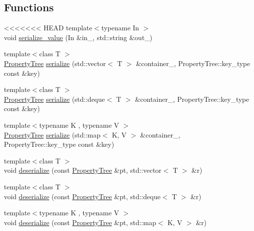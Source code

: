 \subsection*{Functions}
\begin{DoxyCompactItemize}
\item 
<<<<<<< HEAD
{\footnotesize template$<$typename In $>$ }\\void \hyperlink{namespaceserialize_afcd8d07d106f4bf71ce8813e6c2ccbd8}{serialize\+\_\+value} (In \&in\+\_\+, std\+::string \&out\+\_\+)
\item 
{\footnotesize template$<$class T $>$ }\\\hyperlink{namespacesolar__core_adeda2737d6938c190eb774a5b2495045}{Property\+Tree} \hyperlink{namespaceserialize_a48d3582d3d99189f6f067e77d962574f}{serialize} (std\+::vector$<$ T $>$ \&container\+\_\+, Property\+Tree\+::key\+\_\+type const \&key)
\item 
{\footnotesize template$<$class T $>$ }\\\hyperlink{namespacesolar__core_adeda2737d6938c190eb774a5b2495045}{Property\+Tree} \hyperlink{namespaceserialize_aa60e366236e42c68f437ea409aa0e056}{serialize} (std\+::deque$<$ T $>$ \&container\+\_\+, Property\+Tree\+::key\+\_\+type const \&key)
\item 
{\footnotesize template$<$typename K , typename V $>$ }\\\hyperlink{namespacesolar__core_adeda2737d6938c190eb774a5b2495045}{Property\+Tree} \hyperlink{namespaceserialize_a585cc862a49aec3bc1deca353af0b53c}{serialize} (std\+::map$<$ K, V $>$ \&container\+\_\+, Property\+Tree\+::key\+\_\+type const \&key)
\item 
{\footnotesize template$<$class T $>$ }\\void \hyperlink{namespaceserialize_a4c500beb6e6b8eb1c9e62376d3f5ce83}{deserialize} (const \hyperlink{namespacesolar__core_adeda2737d6938c190eb774a5b2495045}{Property\+Tree} \&pt, std\+::vector$<$ T $>$ \&r)
\item 
{\footnotesize template$<$class T $>$ }\\void \hyperlink{namespaceserialize_a067bdd480e2966e4a61457e64dfbca9e}{deserialize} (const \hyperlink{namespacesolar__core_adeda2737d6938c190eb774a5b2495045}{Property\+Tree} \&pt, std\+::deque$<$ T $>$ \&r)
\item 
{\footnotesize template$<$typename K , typename V $>$ }\\void \hyperlink{namespaceserialize_af7e18cf15b955d078b7fc036042cb083}{deserialize} (const \hyperlink{namespacesolar__core_adeda2737d6938c190eb774a5b2495045}{Property\+Tree} \&pt, std\+::map$<$ K, V $>$ \&r)

\end{DoxyCompactItemize}
